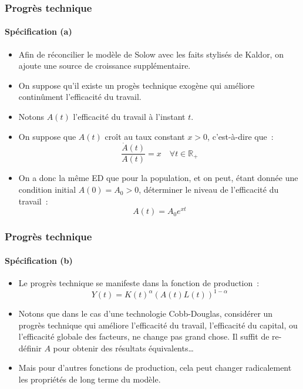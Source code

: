 \documentclass[10pt,notheorems]{beamer}
\theoremstyle{plain}
\theoremstyle{definition} %
\begin{document}
\begin{frame}
  \frametitle{Progrès technique}
  \framesubtitle{Spécification (a)}

  \bigskip

  \begin{itemize}

  \item Afin de réconcilier le modèle de Solow avec les faits stylisés de Kaldor, on ajoute une source de croissance supplémentaire.\newline

  \item On suppose qu'il existe un progès technique exogène qui améliore continûment l'efficacité du travail.\newline

  \item Notons $A(t)$ l'efficacité du travail à l'instant $t$.\newline

  \item On suppose que $A(t)$ croît au taux constant $x>0$, c'est-à-dire que~:
    \[
      \frac{\dot A(t)}{A(t)} = x\quad \forall t\in \mathbb R_+
    \]

    \bigskip

  \item On a donc la même ED que pour la population, et on peut, étant donnée une condition initial $A(0) = A_0>0$, déterminer le niveau de l'efficacité du travail~:
    \[
      A(t) = A_0e^{xt}
    \]

  \end{itemize}

\end{frame}


\begin{frame}
  \frametitle{Progrès technique}
  \framesubtitle{Spécification (b)}

  \bigskip

  \begin{itemize}

  \item Le progrès technique se manifeste dans la fonction de production~:
    \[
      Y(t) = K(t)^\alpha\left(A(t)L(t)\right)^{1-\alpha}
    \]

    \bigskip

  \item Notons que dans le cas d'une technologie Cobb-Douglas,
    considérer un progrès technique qui améliore l'efficacité du
    travail, l'efficacité du capital, ou l'efficacité globale des
    facteurs, ne change pas grand chose. Il suffit de re-définir $A$
    pour obtenir des résultats équivalents\ldots\newline

  \item Mais pour d'autres fonctions de production, cela peut changer
    radicalement les propriétés de long terme du modèle.\newline

  \end{itemize}

\end{frame}
\end{document}
